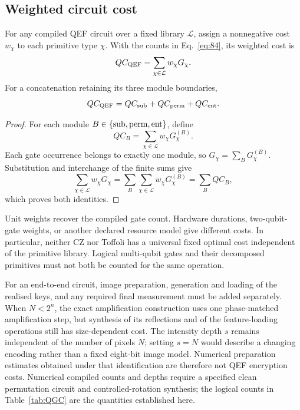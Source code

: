 {\subsection{Weighted circuit cost}

\begin{theorem}
\label{thm:QEF-quantum-cost}
For any compiled QEF circuit over a fixed library $\mathcal L$, assign
a nonnegative cost $w_\chi$ to each primitive type $\chi$. With the
counts in Eq.~\eqref{eq:84}, its weighted cost is
\begin{equation}
QC_{\rm QEF}=\sum_{\chi\in\mathcal L}w_\chi G_\chi.
\label{eq:QC-QEF-final}
\end{equation}
For a concatenation retaining its three module boundaries,
\begin{equation}
QC_{\rm QEF}=QC_{\rm sub}+QC_{\rm perm}+QC_{\rm ent}.
\label{eq:QC-sum-blocks}
\end{equation}
\end{theorem}

\begin{proof}
For each module $B\in\{{\rm sub},{\rm perm},{\rm ent}\}$, define
\begin{equation}
QC_B=\sum_{\chi\in\mathcal L}w_\chi G_\chi^{(B)}.
\label{eq:QC-sum-def}
\end{equation}
Each gate occurrence belongs to exactly one module, so
$G_\chi=\sum_B G_\chi^{(B)}$. Substitution and interchange of the
finite sums give
\begin{equation}
\sum_{\chi\in\mathcal L}w_\chi G_\chi
=\sum_B\sum_{\chi\in\mathcal L}w_\chi G_\chi^{(B)}
=\sum_B QC_B,
\label{eq:QC-expanded}
\end{equation}
which proves both identities.
\end{proof}

Unit weights recover the compiled gate count. Hardware durations,
two-qubit-gate weights, or another declared resource model give
different costs. In particular, neither CZ nor Toffoli has a universal
fixed optimal cost independent of the primitive library. Logical
multi-qubit gates and their decomposed primitives must not both be
counted for the same operation.

For an end-to-end circuit, image preparation, generation and loading of
the realised keys, and any required final measurement must be added
separately. When $N<2^n$, the exact amplification construction uses one
phase-matched amplification step, but synthesis of its reflections and
of the feature-loading operations still has size-dependent cost.
The intensity depth $s$ remains independent of the number of pixels
$N$; setting $s=N$ would describe a changing encoding rather than a
fixed eight-bit image model. Numerical preparation estimates obtained
under that identification are therefore not QEF encryption costs.
Numerical compiled counts and depths require a specified clean
permutation circuit and controlled-rotation synthesis; the logical
counts in Table~\ref{tab:QGC} are the quantities established here.
\par}

